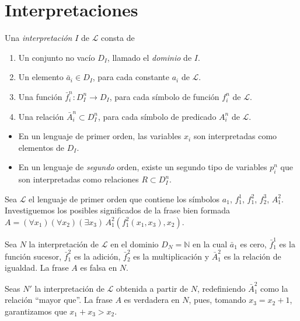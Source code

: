 \chapter{Interpretaciones}

\begin{definition}
Una \textit{interpretación} $I$ de $\mathscr L$ consta de
\begin{enumerate}
    \item Un conjunto no vacío $D_I$, llamado el \textit{dominio} de $I$.
    \item Un elemento $\bar a_i \in D_I$, para cada constante $a_i$ de $\mathscr L$.
    \item Una función $\bar f_i^n : D_I^n \to D_I$, para cada símbolo de función $f_i^n$ de $\mathscr L$.
    \item Una relación $\bar A_i^n \subset D_I^n$, para cada símbolo de predicado $A_i^n$ de $\mathscr L$.
\end{enumerate}
\end{definition}

\begin{remarks}
\leavevmode
\begin{itemize}
    \item En un lenguaje de primer orden, las variables $x_i$ son interpretadas como elementos de $D_I$.
    
    \item En un lenguaje de \textit{segundo} orden, existe un segundo tipo de variables $p_i^n$ que son interpretadas como relaciones $R \subset D_I^n$.
\end{itemize}
\end{remarks}

\begin{example}
Sea $\mathscr L$ el lenguaje de primer orden que contiene los símbolos $a_1$, $f_1^1$, $f_1^2$, $f_2^3$, $A_1^2$. Investiguemos los posibles significados de la frase bien formada $A = (\forall x_1) (\forall x_2) (\exists x_3) \, A_1^2(f_1^2(x_1, x_3), x_2)$.

Sea $N$ la interpretación de $\mathscr L$ en el dominio $D_N = \mathbb N$ en la cual $\bar a_1$ es cero, $\bar f_1^1$ es la función sucesor, $\bar f_1^2$ es la adición, $\bar f_2^2$ es la multiplicación y $\bar A_1^2$ es la relación de igualdad. La frase $A$ es falsa en $N$.

Seas $N'$ la interpretación de $\mathscr L$ obtenida a partir de $N$, redefiniendo $\bar A_1^2$ como la relación ``mayor que''. La frase $A$ es verdadera en $N$, pues, tomando $x_3 = x_2 + 1$, garantizamos que $x_1 + x_3 > x_2$.
\end{example}

